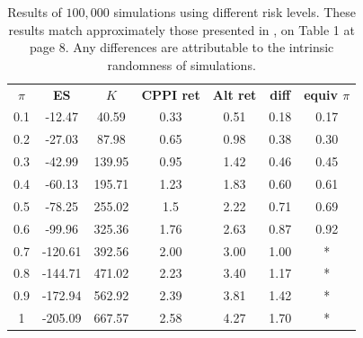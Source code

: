 \begin{table}[H]
\centering
\caption{Results of $100,000$ simulations using different risk levels. These results match approximately those presented in \cite{a:guillen-optimisation}, on Table 1 at page 8. Any differences are attributable to the intrinsic randomness of simulations.}
\label{tab:cppi_alt}
\begin{tabular}{ccccccc}
\textbf{$\pi$} & \textbf{ES } & \textbf{$K$} & \textbf{CPPI ret} & \textbf{Alt ret} & \textbf{diff}  & \textbf{equiv $\pi$}\\
0.1   & -12.47  & 40.59  & 0.33     & 0.51    & 0.18    & 0.17\\
0.2   & -27.03  & 87.98  & 0.65     & 0.98    & 0.38    & 0.30 \\
0.3   & -42.99  & 139.95 & 0.95     & 1.42    & 0.46    & 0.45 \\
0.4   & -60.13  & 195.71 & 1.23     & 1.83    & 0.60    & 0.61 \\
0.5   & -78.25  & 255.02 & 1.5      & 2.22    & 0.71    & 0.69 \\
0.6   & -99.96  & 325.36 & 1.76     & 2.63    & 0.87    & 0.92 \\
0.7   & -120.61 & 392.56 & 2.00     & 3.00    & 1.00    & * \\
0.8   & -144.71 & 471.02 & 2.23     & 3.40    & 1.17    & * \\
0.9   & -172.94 & 562.92 & 2.39     & 3.81    & 1.42    & * \\
1     & -205.09 & 667.57 & 2.58     & 4.27    & 1.70    & *
\end{tabular}
\end{table}
